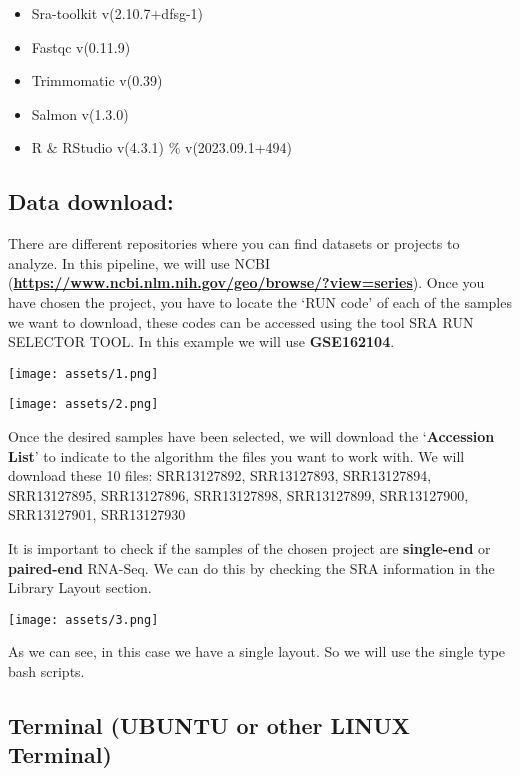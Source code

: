 \documentclass[
]{article}
\providecommand{\tightlist}{%
  \setlength{\itemsep}{0pt}\setlength{\parskip}{0pt}}
\begin{document}
\begin{itemize}
\tightlist
\item
  Sra-toolkit v(2.10.7+dfsg-1)
\item
  Fastqc v(0.11.9)
\item
  Trimmomatic v(0.39)
\item
  Salmon v(1.3.0)
\item
  R \& RStudio v(4.3.1) \% v(2023.09.1+494)
\end{itemize}

\subsection{Data download:}\label{data-download}

There are different repositories where you can find datasets or projects
to analyze. In this pipeline, we will use NCBI
(\href{https://www.ncbi.nlm.nih.gov/geo/browse/?view=series}{\textbf{https://www.ncbi.nlm.nih.gov/geo/browse/?view=series}}).
Once you have chosen the project, you have to locate the `RUN code' of
each of the samples we want to download, these codes can be accessed
using the tool SRA RUN SELECTOR TOOL. In this example we will use
\textbf{GSE162104}.

\texttt{[image: assets/1.png]}

\texttt{[image: assets/2.png]}

Once the desired samples have been selected, we will download the
`\textbf{Accession List}' to indicate to the algorithm the files you
want to work with. We will download these 10 files: SRR13127892,
SRR13127893, SRR13127894, SRR13127895, SRR13127896, SRR13127898,
SRR13127899, SRR13127900, SRR13127901, SRR13127930

It is important to check if the samples of the chosen project are
\textbf{single-end} or \textbf{paired-end} RNA-Seq. We can do this by
checking the SRA information in the Library Layout section.

\texttt{[image: assets/3.png]}

As we can see, in this case we have a single layout. So we will use the
single type bash scripts.

\subsection{Terminal (UBUNTU or other LINUX
Terminal)}\label{terminal-ubuntu-or-other-linux-terminal}
\end{document}
